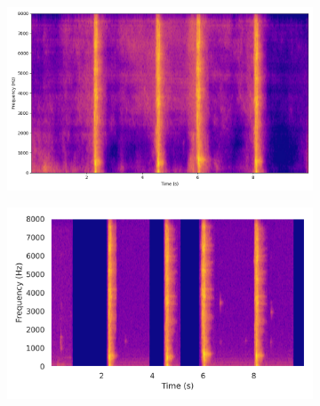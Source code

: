 \begin{figure}[!htbp]
\begin{subfigure}[b]{0.185\textwidth}
        \includegraphics[width=\textwidth]{plots/sword_swoosh/clap sep_spectrogram.png}
    \end{subfigure}
    \begin{subfigure}[b]{0.185\textwidth}
        \centering
        \includegraphics[width=\textwidth]{plots/sword_swoosh/clap target_spectrogram.png}
    \end{subfigure}


\end{figure}
